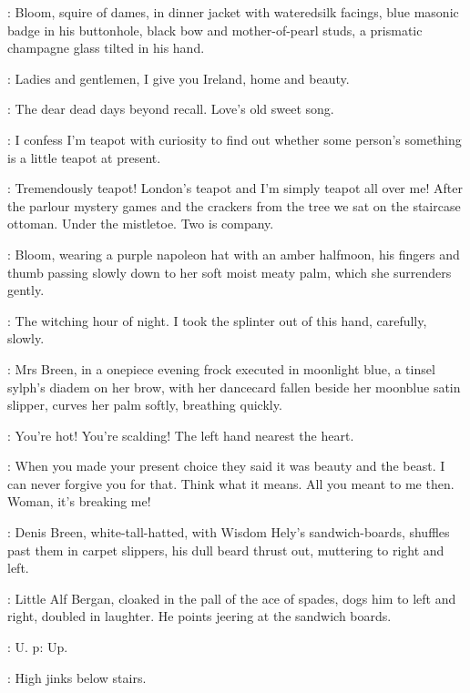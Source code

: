 :
Bloom, squire of dames, in dinner jacket with wateredsilk facings,
blue masonic badge in his buttonhole, black bow and mother-of-pearl studs,
a prismatic champagne glass tilted in his hand.

\Bloom:
Ladies and gentlemen, I give you Ireland, home and beauty.

\MrsBreen:
The dear dead days beyond recall.
Love's old sweet song.

\Bloom:
I confess I'm teapot with curiosity to find out
whether some person's something is a little teapot at present.

\MrsBreen:
Tremendously teapot!
London's teapot and I'm simply teapot all over me!
After the parlour mystery games and the crackers from the tree
we sat on the staircase ottoman.
Under the mistletoe.
Two is company.

:
Bloom, wearing a purple napoleon hat with an amber halfmoon,
his fingers and thumb passing slowly down to her soft moist meaty palm,
which she surrenders gently.

\Bloom:
The witching hour of night.
I took the splinter out of this hand, carefully, slowly.

:
Mrs Breen, in a onepiece evening frock executed in moonlight blue,
a tinsel sylph's diadem on her brow,
with her dancecard fallen beside her moonblue satin slipper,
curves her palm softly, breathing quickly.

\MrsBreen:
You're hot! You're scalding!
The left hand nearest the heart.

\Bloom:
When you made your present choice
they said it was beauty and the beast.
I can never forgive you for that.
Think what it means.
All you meant to me then.
Woman, it's breaking me!

:
Denis Breen, white-tall-hatted, with Wisdom Hely's sandwich-boards,
shuffles past them in carpet slippers, his dull beard thrust out,
muttering to right and left.

:
Little Alf Bergan, cloaked in the pall of the ace of spades,
dogs him to left and right, doubled in laughter.
He points jeering at the sandwich boards.

\AlfBergan:
U. p: Up.

\MrsBreen:
High jinks below stairs.

